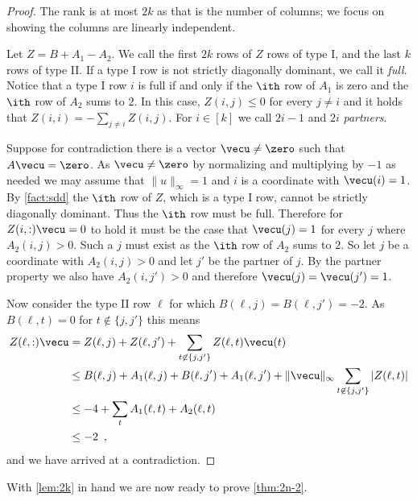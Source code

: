 \begin{proof}
The rank is at most $2k$ as that is the number of columns;  we focus on showing the columns are
linearly independent.

Let $Z = B + A_1 -A_2$.  We call the first $2k$ rows of $Z$ rows of type I, and the last $k$ rows
of type II.  If a type I row is not strictly diagonally dominant, we call it \emph{full}.  Notice that
a type I row $i$ is full if and only if the $\ith$ row of $A_1$ is zero and the $\ith$ row of $A_2$ sums to $2$.  In this
case, $Z(i,j) \le 0$ for every $j \ne i$ and it holds that $Z(i,i) = -\sum_{j \ne i} Z(i,j)$.
%
For $i \in [k]$ we call $2i-1$ and $2i$ \emph{partners}.

Suppose for contradiction there is a vector $\vecu \ne \zero$ such that $A\vecu = \zero$.  As $\vecu \ne \zero$ by
normalizing and multiplying by $-1$ as needed we may assume that $\|u\|_\infty = 1$ and $i$ is a coordinate with $\vecu(i)=1$.
By \cref{fact:sdd} the $\ith$ row of $Z$, which is a type I row, cannot be strictly diagonally dominant.  Thus the $\ith$ row
must be full.  Therefore for $Z(i,:) \vecu = 0$ to hold it must be the case that $\vecu(j) = 1$ for every $j$ where $A_2(i,j) > 0$.
Such a $j$ must exist as the $\ith$ row of $A_2$ sums to $2$.  So let $j$ be a coordinate with $A_2(i,j) > 0$ and let $j'$ be
the partner of $j$.  By the partner property we also have $A_2(i,j') > 0$ and therefore $\vecu(j) = \vecu(j') = 1$.

Now consider the type II row $\ell$ for which $B(\ell,j) = B(\ell,j') = -2$.
As $B(\ell,t) = 0$ for $t \not \in \{j,j'\}$ this means
\begin{align*}
Z(\ell,:) \vecu &= Z(\ell,j) + Z(\ell, j') + \sum_{t \not \in \{j,j'\}} Z(\ell,t) \vecu(t) \\
& \le B(\ell,j)+A_1(\ell,j) + B(\ell,j') + A_1(\ell,j') + \|\vecu\|_\infty \sum_{t \not \in \{j,j'\}} |Z(\ell,t)| \\
&\le -4 + \sum_{t} A_1(\ell,t) + A_2(\ell,t) \\
&\le -2 \enspace,
\end{align*}
and we have arrived at a contradiction.
 \end{proof}

With \cref{lem:2k} in hand we are now ready to prove \cref{thm:2n-2}.


